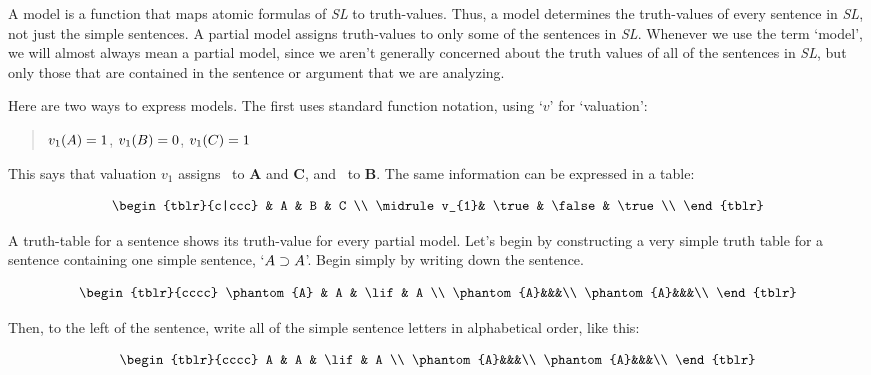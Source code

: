 \documentclass[../logic-text.tex]{subfiles}
\begin{document}
A model is a function that maps atomic formulas of \emph{SL} to truth-values.
Thus, a model determines the truth-values of every sentence in \emph{SL}, not just the simple sentences.
A partial model assigns truth-values to only some of the sentences in \emph{SL}.
Whenever we use the term \enquote*{model}, we will almost always mean a partial model, since we aren't generally concerned about the truth values of all of the sentences in \emph{SL}, but only those that are contained in the sentence or argument that we are analyzing.

Here are two ways to express models. The first uses standard function notation, using \enquote*{\(v\)} for \enquote*{valuation}:

\begin{quote}
  \(v_{1}(A) = 1\), \(v_{1}(B) = 0\), \(v_{1}(C) = 1\)
\end{quote}

\noindent This says that valuation \(v_{1}\) assigns \true\ to \textbf{A} and \textbf{C}, and \false\ to \textbf{B}. The same information can be expressed in a table:


\[
\begin{tblr}{c|ccc}
  & A & B & C \\ \midrule
  v_{1}& \true & \false & \true \\
\end{tblr}
\]


A truth-table for a sentence shows its truth-value for every partial model.
Let's begin by constructing a very simple truth table for a sentence containing one simple sentence, \enquote*{\(A \supset A\)}.
Begin simply by writing down the sentence.

\[
  \begin{tblr}{cccc}
    \phantom{A} & A & \lif & A \\
    \phantom{A}&&&\\
    \phantom{A}&&&\\
  \end{tblr}
\]

Then, to the left of the sentence, write all of the simple sentence letters in alphabetical order, like this:

\[
  \begin{tblr}{cccc}
    A & A & \lif & A \\
    \phantom{A}&&&\\
    \phantom{A}&&&\\
  \end{tblr}
\]
\end{document}
